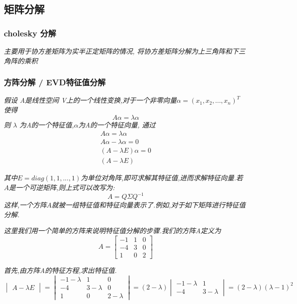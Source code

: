 \documentclass{scrartcl}
\numberwithin{equation}{section}
\begin{document}
\subsection{矩阵分解}
\subsubsection{cholesky 分解}
\textsl{
    主要用于协方差矩阵为实半正定矩阵的情况, 将协方差矩阵分解为上三角阵和下三角阵的乘积 
}
\subsubsection{方阵分解 / EVD特征值分解}

\textsl{
    假设 A是线性空间 V上的一个线性变换,对于一个非零向量$\alpha = (x_1, x_2, ... , x_n)^T$ 使得}
\begin{equation}
    A\alpha = \lambda \alpha
\end{equation}
\textsl{
    则 $\lambda$ 为A的一个特征值,$\alpha$为A的一个特征向量, 通过}
\begin{equation}
    \begin{aligned}
        A\alpha = \lambda \alpha     \\
        A\alpha - \lambda \alpha = 0 \\
        (A - \lambda E) \alpha = 0   \\
        (A - \lambda E)
    \end{aligned}
\end{equation}

\textsl{
    其中$E = diag(1,1,...,1)$为单位对角阵,即可求解其特征值,进而求解特征向量.若$A$是一个可逆矩阵,则上式可以改写为:
    $$A = Q \Sigma Q^{-1}$$这样,一个方阵$A$就被一组特征值和特征向量表示了.例如,对于如下矩阵进行特征值分解.
}


\textsl{
    这里我们用一个简单的方阵来说明特征值分解的步骤.我们的方阵A定义为}
\[A=\left[ \begin{array}{ccc}
            -1 & 1 & 0 \\
            -4 & 3 & 0 \\
            1  & 0 & 2
        \end{array}
        \right ]\]

\textsl{
    首先,由方阵A的特征方程,求出特征值.
}
\[
    \begin{vmatrix} A -\lambda E \end{vmatrix}
    = \begin{vmatrix}
        -1-\lambda & 1           & 0           \\
        -4         & 3 - \lambda & 0           \\
        1          & 0           & 2 - \lambda
    \end{vmatrix} = (2-\lambda)\begin{vmatrix} -1-\lambda & 1 \\ -4 & 3-\lambda
    \end{vmatrix} = (2-\lambda) (\lambda -1)^2
\]
\end{document}
